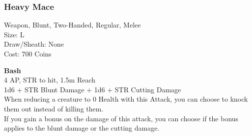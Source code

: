 \subsubsection{Heavy Mace}\label{weapon:heavyMace}
Weapon, Blunt, Two-Handed, Regular, Melee\\
Size: L\\
Draw/Sheath: None\\
Cost: 700 Coins

\textbf{Bash}\\
4 AP, STR to hit, 1.5m Reach\\
1d6 + \texttimes STR Blunt Damage + 1d6 + \texttimes STR Cutting Damage\\
When reducing a creature to 0 Health with this Attack, you can choose to knock them out instead of killing them.\\
If you gain a bonus on the damage of this attack, you can choose if the bonus applies to the blunt damage or the cutting damage.